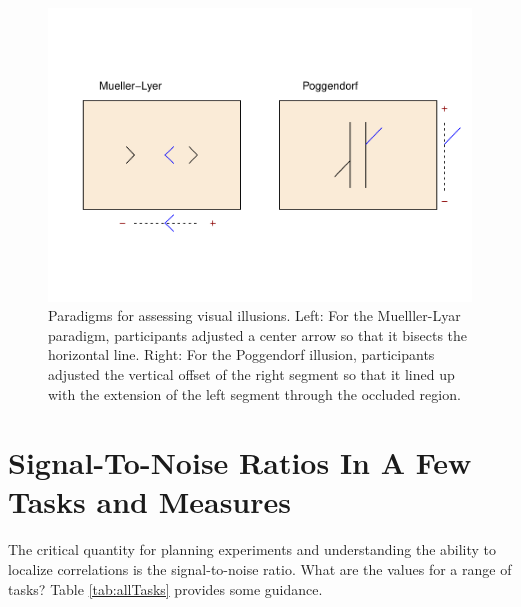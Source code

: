 \documentclass[
  ,man]{apa6}
\begin{document}
\begin{figure}
\centering
\includegraphics{p_files/figure-latex/ill-1.pdf}
\caption{\label{fig:ill}Paradigms for assessing visual illusions. Left: For the Muelller-Lyar paradigm, participants adjusted a center arrow so that it bisects the horizontal line. Right: For the Poggendorf illusion, participants adjusted the vertical offset of the right segment so that it lined up with the extension of the left segment through the occluded region.}
\end{figure}

\hypertarget{signal-to-noise-ratios-in-a-few-tasks-and-measures}{%
\section{Signal-To-Noise Ratios In A Few Tasks and Measures}\label{signal-to-noise-ratios-in-a-few-tasks-and-measures}}

The critical quantity for planning experiments and understanding the ability to localize correlations is the signal-to-noise ratio. What are the values for a range of tasks? Table \ref{tab:allTasks} provides some guidance.
\end{document}
